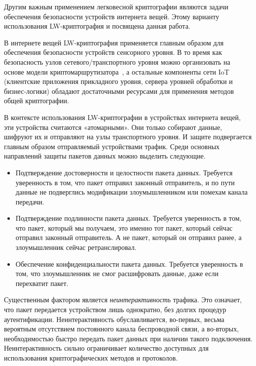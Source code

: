Другим важным применением легковесной криптографии являются задачи обеспечения безопасности устройств интернета вещей. Этому варианту использования LW-криптография и посвящена данная работа.

В интернете вещей LW-криптография применяется главным образом для обеспечения безопасности устройств сенсорного уровня. В то время как безопасность узлов сетевого/транспортного уровня можно организовать на основе модели криптомаршрутизатора~\cite{src23}, а остальные компоненты сети IoT (клиентские приложения прикладного уровня, сервера уровней обработки и бизнес-логики) обладают достаточными ресурсами для применения методов общей криптографии.

В контексте использования LW-криптографии в устройствах интернета вещей, эти устройства считаются «атомарными». Они только собирают данные, шифруют их и отправляют на узлы транспортного уровня. И защите подвергается главным образом отправляемый устройствами трафик. Среди основных направлений защиты пакетов данных можно выделить следующие.
\begin{itemize}
	\item Подтверждение достоверности и целостности пакета данных. Требуется уверенность в том, что пакет отправил законный отправитель, и по пути данные не подверглись модификации злоумышленником или помехам канала передачи.
	\item Подтверждение подлинности пакета данных. Требуется уверенность в том, что пакет, который мы получаем, это именно тот пакет, который сейчас отправил законный отправитель. А не пакет, который он отправил ранее, а злоумышленник сейчас ретранслировал.
	\item Обеспечение конфиденциальности пакета данных. Требуется уверенность в том, что злоумышленник не смог расшифровать данные, даже если перехватит пакет.
\end{itemize}

Существенным фактором является \textit{неинтерактивность} трафика. Это означает, что пакет передается устройством лишь однократно, без долгих процедур аутентификации. Неинтерактивность обуславливается, во-первых, весьма вероятным отсутствием постоянного канала беспроводной связи, а во-вторых, необходимостью быстро передать пакет данных при наличии такого подключения. Неинтерактивность сильно ограничивает количество доступных для использования криптографических методов и протоколов.

